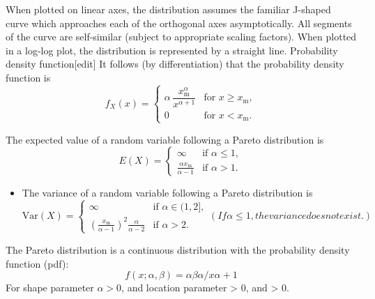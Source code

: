 \begin{frame}
\begin{itemize}
When plotted on linear axes, the distribution assumes the familiar J-shaped curve which approaches each of the orthogonal axes asymptotically. All segments of the curve are self-similar (subject to appropriate scaling factors). When plotted in a log-log plot, the distribution is represented by a straight line.
Probability density function[edit]
It follows (by differentiation) that the probability density function is
\[
f_X(x)= \begin{cases} \alpha\,\dfrac{x_\mathrm{m}^\alpha}{x^{\alpha+1}} & \text{for }x \ge x_\mathrm{m}, \\[12pt] 0 & \text{for } x < x_\mathrm{m}. \end{cases} 
\]
\end{itemize}
\end{frame}

\begin{frame}
\begin{itemize}
The expected value of a random variable following a Pareto distribution is
\[
E(X)= \begin{cases} \infty & \text{if }\alpha\le 1, \\ \frac{\alpha x_\mathrm{m}}{\alpha-1} & \text{if }\alpha>1. \end{cases}
\]
\end{itemize}
\end{frame}

\begin{frame}
\begin{itemize}

\item The variance of a random variable following a Pareto distribution is
\[
\mathrm{Var}(X)= \begin{cases} \infty & \text{if }\alpha\in(1,2], \\ \left(\frac{x_\mathrm{m}}{\alpha-1}\right)^2 \frac{\alpha}{\alpha-2} & \text{if }\alpha>2. \end{cases}
(If \alpha\le 1, the variance does not exist.)
\]


\end{itemize}
\end{frame}

\begin{frame}
\begin{itemize}


The Pareto distribution is 
a continuous distribution with the probability density function (pdf):
\[
f(x; \alpha, \beta) = \alpha\beta\alpha / x\alpha+ 1
\]
For shape parameter $\alpha > 0$, and location parameter \beta > 0, and \alpha > 0.
\end{itemize}
\end{frame}

